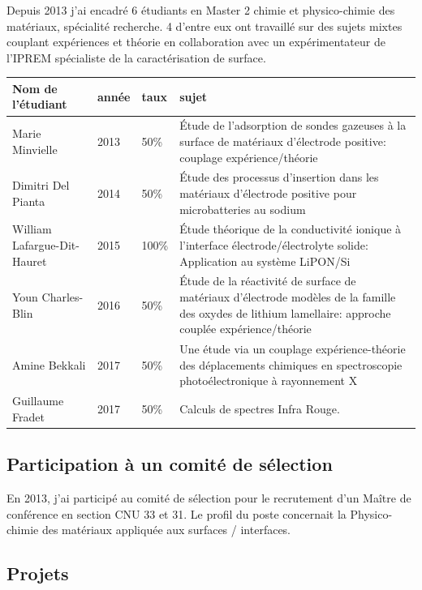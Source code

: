 \documentclass[11pt]{artuppax}
\newcounter{subsec}[section]
\begin{document}
Depuis 2013 j'ai encadré 6 étudiants en Master 2 chimie et physico-chimie des matériaux,
spécialité recherche. 4 d'entre eux ont travaillé sur des sujets mixtes couplant expériences
et théorie en collaboration avec un expérimentateur de l'IPREM spécialiste de la caractérisation de
surface.

\begin{tabularx}{\textwidth}{lllX}
\hline
Nom de l'étudiant & année & taux & sujet \\
\hline
Marie Minvielle & 2013 & 50\% & Étude de l'adsorption de sondes gazeuses à la surface de
                                matériaux d'électrode positive: couplage expérience/théorie \\
Dimitri Del Pianta & 2014 & 50\% & Étude des processus d'insertion dans les matériaux
                                   d'électrode positive pour microbatteries au sodium \\
William Lafargue-Dit-Hauret & 2015 & 100\% & Étude théorique de la conductivité ionique à
                                     l'interface
                                     électrode/électrolyte solide: Application au système
                                     LiPON/Si\\
Youn Charles-Blin & 2016 & 50\% & Étude de la réactivité de surface de matériaux d'électrode
                                  modèles de la famille des oxydes de lithium lamellaire:
                                  approche couplée expérience/théorie\\
Amine Bekkali & 2017 & 50\% & Une étude via un couplage expérience-théorie des déplacements
                              chimiques en spectroscopie photoélectronique à rayonnement X\\
Guillaume Fradet & 2017 & 50\% & Calculs de spectres Infra Rouge.\\
\hline
\end{tabularx}

\subsection{Participation à un comité de sélection}

En 2013, j'ai participé au comité de sélection pour le recrutement d'un Maître de
conférence en section CNU 33 et 31. Le profil du poste concernait la
Physico-chimie des matériaux appliquée aux surfaces / interfaces.

\subsection{Projets}
\end{document}
